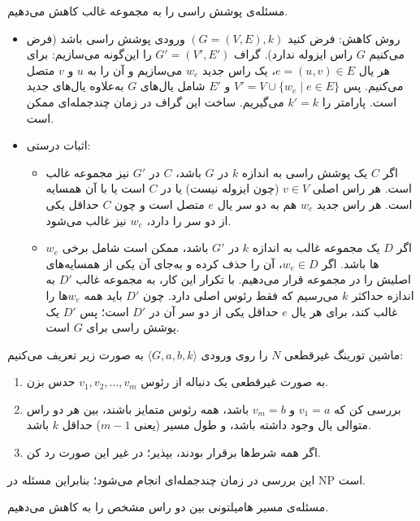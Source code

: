 مسئله‌ی پوشش راسی را به مجموعه غالب کاهش می‌دهیم.

\begin{itemize}
    \item {روش کاهش:} فرض کنید $(G=(V,E), k)$ ورودی پوشش راسی باشد (فرض می‌کنیم $G$ راس ایزوله ندارد). گراف $G'=(V',E')$ را این‌گونه می‌سازیم: برای هر یال $e=(u,v) \in E$، یک راس جدید $w_e$ می‌سازیم و آن را به $u$ و $v$ متصل می‌کنیم. پس $V' = V \cup \{w_e \mid e \in E\}$ و $E'$ شامل یال‌های $G$ به‌علاوه یال‌های جدید است. پارامتر را $k' = k$ می‌گیریم. ساخت این گراف در زمان چندجمله‌ای ممکن است.

    \item {اثبات درستی:}
    \begin{itemize}
        \item اگر $C$ یک پوشش راسی به اندازه $k$ در $G$ باشد، $C$ در $G'$ نیز مجموعه غالب است. هر راس اصلی $v \in V$ (چون ایزوله نیست) یا در $C$ است یا با آن همسایه است. هر راس جدید $w_e$ هم به دو سر یال $e$ متصل است و چون $C$ حداقل یکی از دو سر را دارد، $w_e$ نیز غالب می‌شود.
        \item اگر $D$ یک مجموعه غالب به اندازه $k$ در $G'$ باشد، ممکن است شامل برخی $w_e$ها باشد. اگر $w_e \in D$، آن را حذف کرده و به‌جای آن یکی از همسایه‌های اصلیش را در مجموعه قرار می‌دهیم. با تکرار این کار، به مجموعه غالب $D'$ به اندازه حداکثر $k$ می‌رسیم که فقط رئوس اصلی دارد. چون $D'$ باید همه $w_e$ها را غالب کند، برای هر یال $e$ حداقل یکی از دو سر آن در $D'$ است؛ پس $D'$ یک پوشش راسی برای $G$ است.
    \end{itemize}
\end{itemize}


ماشین تورینگ غیرقطعی $N$ را روی ورودی $\langle G, a, b, k \rangle$ به صورت زیر تعریف می‌کنیم:
\begin{enumerate}
    \item به صورت غیرقطعی یک دنباله از رئوس $v_1, v_2, \dots, v_m$ حدس بزن.
    \item بررسی کن که $v_1 = a$ و $v_m = b$ باشد، همه رئوس متمایز باشند، بین هر دو راس متوالی یال وجود داشته باشد، و طول مسیر (یعنی $m-1$) حداقل $k$ باشد.
    \item اگر همه شرط‌ها برقرار بودند، {بپذیر}؛ در غیر این صورت {رد کن}.
\end{enumerate}
این بررسی در زمان چندجمله‌ای انجام می‌شود؛ بنابراین مسئله در NP است.

مسئله‌ی مسیر هامیلتونی بین دو راس مشخص را به  کاهش می‌دهیم.

